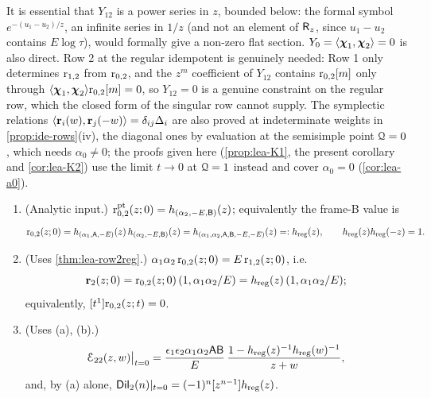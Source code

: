 It is essential that $Y_{12}$ is a power series in $z$, bounded below: the formal symbol $e^{-(u_1-u_2)/z}$, an infinite series in $1/z$ (and not an element of $\mathsf{R}_{z}$, since $u_1-u_2$ contains $E\log\tau$), would formally give a non-zero flat section. $Y_0 = \langle\boldsymbol{\chi}_1,\boldsymbol{\chi}_2\rangle = 0$ is also direct. Row 2 at the regular idempotent is genuinely needed: Row 1 only determines $\mathrm{r}_{1,2}$ from $\mathrm{r}_{0,2}$, and the $z^m$ coefficient of $Y_{12}$ contains $\mathrm{r}_{0,2}[m]$ only through $\langle\boldsymbol{\chi}_1,\boldsymbol{\chi}_2\rangle\mathrm{r}_{0,2}[m] = 0$, so $Y_{12} = 0$ is a genuine constraint on the regular row, which the closed form of the singular row cannot supply. The symplectic relations $\langle\mathbf{r}_i(w),\mathbf{r}_j(-w)\rangle = \delta_{ij}\Delta_i$ are also proved at indeterminate weights in \cref{prop:ide-rows}(iv), the diagonal ones by evaluation at the semisimple point $\mathcal{Q} = 0$, which needs $\alpha_0\neq 0$; the proofs given here (\cref{prop:lea-K1}, the present corollary and \cref{cor:lea-K2}) use the limit $t\to 0$ at $\mathcal{Q} = 1$ instead and cover $\alpha_0 = 0$ (\cref{cor:lea-a0}).

\begin{prop}[the regular rows at $t = 0$]
\label{prop:lea-regrows}
\begin{enumerate}
\item[(a)] (Analytic input.) $\mathrm{r}^{\mathrm{pt}}_{0,2}(z;0) = h_{(\alpha_2,-E,\mathsf{B})}(z)$; equivalently the frame-B value is
\[
\mathrm{r}_{0,2}(z;0) = h_{(\alpha_1,\mathsf{A},-E)}(z)\,h_{(\alpha_2,-E,\mathsf{B})}(z) = h_{(\alpha_1,\alpha_2,\mathsf{A},\mathsf{B},-E,-E)}(z) =: h_{\mathrm{reg}}(z),\qquad h_{\mathrm{reg}}(z)h_{\mathrm{reg}}(-z) = 1 .
\]
\item[(b)] (Uses \cref{thm:lea-row2reg}.) $\alpha_1\alpha_2\,\mathrm{r}_{0,2}(z;0) = E\,\mathrm{r}_{1,2}(z;0)$, i.e.
\[
\mathbf{r}_2(z;0) = \mathrm{r}_{0,2}(z;0)\,(1,\alpha_1\alpha_2/E) = h_{\mathrm{reg}}(z)\,(1,\alpha_1\alpha_2/E);
\]
equivalently, $[t^1]\mathrm{r}_{0,2}(z;t) = 0$.
\item[(c)] (Uses (a), (b).)
\[
\mathcal{E}_{22}(z,w)\big|_{t=0} = \frac{\epsilon_1\epsilon_2\alpha_1\alpha_2\mathsf{A}\mathsf{B}}{E}\,\frac{1 - h_{\mathrm{reg}}(z)^{-1}h_{\mathrm{reg}}(w)^{-1}}{z+w},
\]
and, by (a) alone, $\mathsf{Dil}_2(n)|_{t=0} = (-1)^n[z^{n-1}]h_{\mathrm{reg}}(z)$.
\end{enumerate}
\end{prop}

